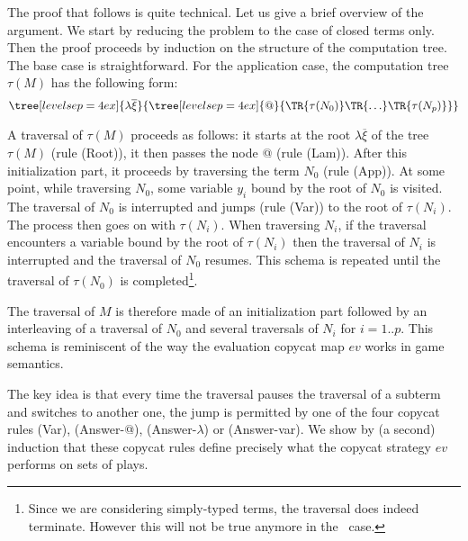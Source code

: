\begin{remark} The proof that follows is quite technical. Let us give a brief overview of the argument.
    We start by reducing the problem to the case of closed terms only. Then the proof proceeds by induction on the structure of the computation tree.
The base case is straightforward. For the application case, the
computation tree $\tau(M)$ has the following form:
    $$ \tree[levelsep=4ex]{\lambda \overline{\xi}}
        { \tree[levelsep=4ex]{@}
            {   \TR{\tau(N_0)} \TR{\ldots} \TR{\tau(N_p)}}}
    $$

    A traversal of $\tau(M)$ proceeds as follows: it starts at the root $\lambda \overline{\xi}$ of the tree $\tau(M)$ (rule
    (Root)), it then passes the node @ (rule (Lam)).
    After this initialization part, it proceeds by traversing the term $N_0$ (rule (App)).
    At some point, while traversing $N_0$, some variable $y_i$ bound by the root of $N_0$ is visited. The traversal
    of $N_0$ is interrupted and jumps (rule (Var)) to the root of $\tau(N_i)$. The process then goes on with $\tau(N_i)$.
    When traversing $N_i$, if the traversal encounters a variable bound by the root of $\tau(N_i)$ then the traversal of $N_i$
    is interrupted and
    the traversal of $N_0$ resumes.  This schema is repeated until the traversal of $\tau(N_0)$ is completed\footnote{Since we are considering
    simply-typed terms, the traversal does indeed terminate. However this will not be true anymore in the \pcf\ case.}.

    The traversal of $M$ is therefore made of an initialization part followed by an interleaving of a traversal of $N_0$ and
    several traversals of $N_i$ for $i=1..p$. This schema is reminiscent of the way the evaluation copycat map $ev$ works in game semantics.

    The key idea is that every time the traversal pauses the traversal of a subterm and switches to another one,
    the jump is permitted by one of the four copycat rules (Var), (Answer-@), (Answer-$\lambda$) or (Answer-var).
    We show by (a second) induction that these copycat rules define precisely what the copycat strategy $ev$ performs on sets of plays.


\end{remark}
